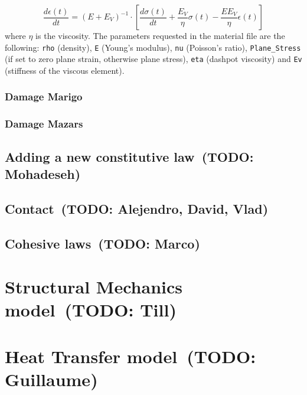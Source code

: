\documentclass[a4paper,11pt]{book}
\newcommand{\code}[1]{\texttt{#1}}
\newcommand{\todo}[1]{~({\small\color{red}\textbf{TODO: }\textbf{#1}})}
\begin{document}
\begin{equation}
    \frac{d\epsilon(t)}{dt} = \left ( E + E_V \right ) ^ {-1} \cdot \left [ \frac{d\sigma(t)}{dt} + \frac{E_V}{\eta}\sigma(t) - \frac{EE_V}{\eta}\epsilon(t) \right ]
\end{equation}
where $\eta$ is the viscosity.
The parameters requested in the material file are the following: \code{rho} (density), \code{E} (Young's modulus), \code{nu} (Poisson's ratio), \code{Plane\_Stress} (if set to zero plane strain, otherwise plane stress), \code{eta} (dashpot viscosity) and \code{Ev} (stiffness of the viscous element).

\subsubsection{Damage Marigo}
\subsubsection{Damage Mazars}

\subsection{Adding a new constitutive law\todo{Mohadeseh}}

\subsection{Contact\todo{Alejendro, David, Vlad}}

\subsection{Cohesive laws\todo{Marco}}


\section{Structural Mechanics model\todo{Till}}

\section{Heat Transfer model\todo{Guillaume}}

\end{document}
